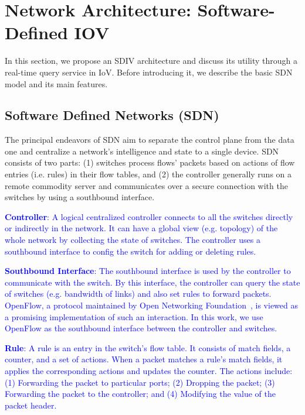 \documentclass[journal]{IEEEtran}
\begin{document}
\section{Network Architecture: Software-Defined IOV} \label{Architecture}

In this section, we propose an SDIV architecture and discuss its utility through a real-time query service in IoV. Before introducing it, we describe the basic SDN model and its main features.

\subsection{Software Defined Networks (SDN)}\label{SDN}

The principal endeavors of SDN aim to separate the control plane from the data one and centralize a network's intelligence and state to a single device. SDN consists of two parts: (1) switches process flows' packets based on actions of flow entries (i.e. rules) in their flow tables, and (2) the controller generally runs on a remote commodity server and communicates over a secure connection with the switches by using a southbound interface. 

\textcolor{blue}{
\textbf{Controller}: A logical centralized controller connects to all the switches directly or indirectly in the network. It can have a global view (e.g. topology) of the whole network by collecting the state of switches. The controller uses a southbound interface to config the switch for adding or deleting rules.}

\textcolor{blue}{
\textbf{Southbound Interface}: The southbound interface is used by the controller to communicate with the switch. By this interface, the controller can query the state of switches (e.g. bandwidth of links) and also set rules to forward packets. OpenFlow, a protocol maintained by Open Networking Foundation~\cite{ONF}, is viewed as a promising implementation of such an interaction. In this work, we use OpenFlow as the southbound interface between the controller and switches.}

\textcolor{blue}{
\textbf{Rule}: A rule is an entry in the switch's flow table. It consists of match fields, a counter, and a set of actions. When a packet matches a rule's match fields, it applies the corresponding actions and updates the counter. The actions include: (1) Forwarding the packet to particular ports; (2) Dropping the packet; (3) Forwarding the packet to the controller; and (4) Modifying the value of the packet header.}
\end{document}
